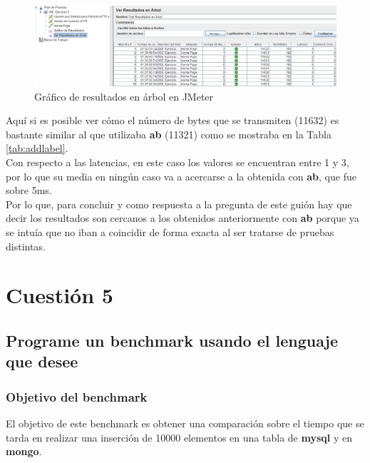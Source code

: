 \begin{figure}[H] %
	\centering
	\includegraphics[scale=0.5]{figuras/ejercicio4/figura4-11.png} 
	\caption{Gráfico de resultados en árbol en JMeter} 
	\label{fig:figura4-11}
\end{figure}

Aquí si es posible ver cómo el número de bytes que se transmiten (11632) es bastante similar al que utilizaba \textbf{ab} (11321) como se mostraba en la Tabla \ref{tab:addlabel}.
\\

Con respecto a las latencias, en este caso los valores se encuentran entre 1 y 3, por lo que su media en ningún caso va a acercarse a la obtenida con \textbf{ab}, que fue sobre 5ms.
\\

Por lo que, para concluir y como respuesta a la pregunta de este guión hay que decir los resultados son cercanos a los obtenidos anteriormente con \textbf{ab} porque ya se intuía que no iban a coincidir de forma exacta al ser tratarse de pruebas distintas.


\section{Cuestión 5}
\subsection{Programe un benchmark usando el lenguaje que desee}

\subsubsection{Objetivo del benchmark}
El objetivo de este benchmark es obtener una comparación sobre el tiempo que se tarda en realizar una inserción de 10000 elementos en una tabla de \textbf{mysql} y en \textbf{mongo}.

